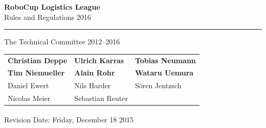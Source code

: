 \documentclass[12pt,twoside]{article}
\begin{document}
\hypersetup{pageanchor=false}


\begin{titlepage}
  \vspace*{5cm}
  \begin{center}
    \begin{LARGE}
      
      {\bf RoboCup Logistics League}\\[2ex]
      {\Large Rules and Regulations 2016}\\[4ex]
    \end{LARGE}
    \hrule
    
    {\LARGE\vspace*{4ex}}
    \begin{Large}
      The Technical Committee 2012--2016\\[6ex]
    \end{Large}
    \begin{tabular}{lll}
      \textbf{Christian Deppe}&\textbf{Ulrich Karras}&\textbf{Tobias Neumann}\\
      \textbf{Tim Niemueller}&\textbf{Alain Rohr}&\textbf{Wataru Uemura}\\[.5em]
      
      Daniel Ewert&Nils Harder&S\"oren Jentzsch\\
      Nicolas Meier&Sebastian Reuter&\\
    \end{tabular}
    \vfill
    Revision Date: Friday, December 18\textsuperscript{} 2015 %
  \end{center}
\end{titlepage}
\thispagestyle{empty}
\pagebreak
\clearpage

\hypersetup{pageanchor=true}
\setcounter{page}{1}
\tableofcontents
\newpage
\cleardoublepage

\setcounter{page}{1}

\end{document}
